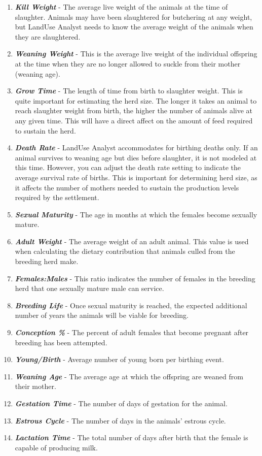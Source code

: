 \begin{enumerate}
	\item \textit{\textbf{Kill Weight}} - The average live weight of the animals at the time of slaughter. Animals may have been slaughtered for butchering at any weight, but LandUse Analyst needs to know the average weight of the animals when they are slaughtered. %
		\item \textit{\textbf{Weaning Weight}} - This is the average live weight of the individual offspring at the time when they are no longer allowed to suckle from their mother (weaning age).
	\item \textit{\textbf{Grow Time}} - The length of time from birth to slaughter weight. This is quite important for estimating the herd size. The longer it takes an animal to reach slaughter weight from birth, the higher the number of animals alive at any given time. This will have a direct affect on the amount of feed required to sustain the herd. 
	\item \textit{\textbf{Death Rate}} - LandUse Analyst accommodates for birthing deaths only. If an animal survives to weaning age but dies before slaughter, it is not modeled at this time. However, you can adjust the death rate setting to indicate the average survival rate of births. This is important for determining herd size, as it affects the number of mothers needed to sustain the production levels required by the settlement. 
	\item \textit{\textbf{Sexual Maturity}} - The age in months at which the females become sexually mature.
	\item \textit{\textbf{Adult Weight}} - The average weight of an adult animal.  This value is used when calculating the dietary contribution that animals culled from the breeding herd make.
	\item \textit{\textbf{Females:Males}} - This ratio indicates the number of females in the breeding herd that one sexually mature male can service.
	\item \textit{\textbf{Breeding Life}} - Once sexual maturity is reached, the expected additional number of years the animals will be viable for breeding.
	\item \textit{\textbf{Conception \%}} - The percent of adult females that become pregnant after breeding has been attempted.
	\item \textit{\textbf{Young/Birth}} - Average number of young born per birthing event.
	\item \textit{\textbf{Weaning Age}} - The average age at which the offspring are weaned from their mother.
	\item \textit{\textbf{Gestation Time}} - The number of days of gestation for the animal.
	\item \textit{\textbf{Estrous Cycle}} - The number of days in the animals' estrous cycle.
	\item \textit{\textbf{Lactation Time}} - The total number of days after birth that the female is capable of producing milk.
\end{enumerate}

